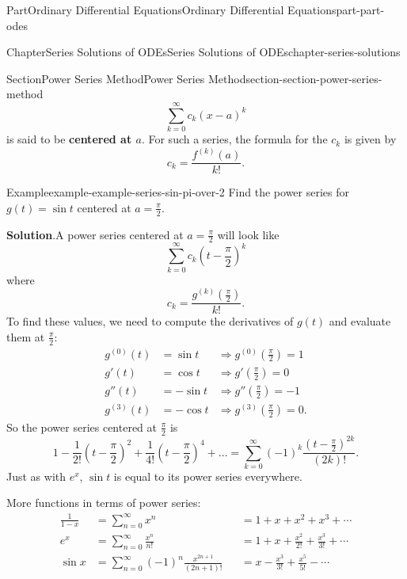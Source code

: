 \documentclass[twoside,10pt,]{book}
\newcommand{\blocktitlefont}{\relax}
\newcommand{\terminology}[1]{\textbf{#1}}
\numberwithin{equation}{part}
\newcommand{\parens}[1]{\left( #1 \right)}
\begin{document}
\begin{partptx}{Part}{Ordinary Differential Equations}{}{Ordinary Differential Equations}{}{}{part-part-odes}
\begin{chapterptx}{Chapter}{Series Solutions of ODEs}{}{Series Solutions of ODEs}{}{}{chapter-series-solutions}
\begin{sectionptx}{Section}{Power Series Method}{}{Power Series Method}{}{}{section-section-power-series-method}
\begin{equation*}
\sum_{k=0}^{\infty}c_{k}(x-a)^{k}
\end{equation*}
is said to be \terminology{centered at \(a\)}. For such a series, the formula for the \(c_{k}\) is given by%
\begin{equation*}
c_{k} = \frac{f^{(k)}(a)}{k!}.
\end{equation*}
%
\begin{example}{Example}{}{example-example-series-sin-pi-over-2}%
Find the power series for \(g(t) = \sin t\) centered at \(a = \frac{\pi}{2}\).%
\par\smallskip%
\noindent\textbf{\blocktitlefont Solution}.\hypertarget{solution-example-series-sin-pi-over-2-b}{}\quad{}A power series centered at \(a = \frac{\pi}{2}\) will look like%
\begin{equation*}
\sum_{k=0}^{\infty}c_{k}\parens{t-\frac{\pi}{2}}^{k}
\end{equation*}
where%
\begin{equation*}
c_{k} = \frac{g^{(k)}(\frac{\pi}{2})}{k!}.
\end{equation*}
To find these values, we need to compute the derivatives of \(g(t)\) and evaluate them at \(\frac{\pi}{2}\):%
\begin{align*}
g^{(0)}(t) &= \sin t &\Rightarrow g^{(0)}(\frac{\pi}{2}) = 1\\
g'(t) &= \cos t &\Rightarrow g'(\frac{\pi}{2}) = 0\\
g''(t) &= -\sin t &\Rightarrow g''(\frac{\pi}{2}) = -1\\
g^{(3)}(t) &= -\cos t &\Rightarrow g^{(3)}(\frac{\pi}{2}) = 0\text{.}
\end{align*}
So the power series centered at \(\frac{\pi}{2}\) is%
\begin{equation*}
1 - \frac{1}{2!}(t-\frac{\pi}{2})^{2} + \frac{1}{4!}(t-\frac{\pi}{2})^{4}+\dots = \sum_{k=0}^{\infty}(-1)^{k}\frac{(t-\frac{\pi}{2})^{2k}}{(2k)!}.
\end{equation*}
Just as with \(e^{x}\), \(\sin t\) is equal to its power series everywhere.%
\end{example}
More functions in terms of power series:%
\begin{align*}
\frac{1}{1-x} &= \sum_{n=0}^{\infty}x^{n} & &= 1 + x + x^{2} + x^{3} + \cdots\\
e^{x} &= \sum_{n=0}^{\infty}\frac{x^{n}}{n!} & &= 1 + x + \frac{x^{2}}{2!} + \frac{x^{3}}{3!} + \cdots\\
\sin x &= \sum_{n=0}^{\infty}(-1)^{n}\frac{x^{2n+1}}{(2n+1)!} & &= x - \frac{x^{3}}{3!} + \frac{x^{5}}{5!} - \cdots\\

\end{align*}
\end{sectionptx}
\end{chapterptx}
\end{partptx}
\end{document}

